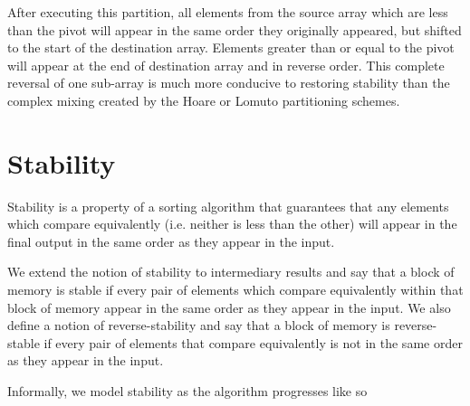 \documentclass{juliacon}
\begin{document}
After executing this partition, all elements from the source array which are less than the pivot will appear in the same order they originally appeared, but shifted to the start of the destination array. Elements greater than or equal to the pivot will appear at the end of destination array and in reverse order. This complete reversal of one sub-array is much more conducive to restoring stability than the complex mixing created by the Hoare \cite{quicksort} or Lomuto \cite{lomuto} partitioning schemes.

\section{Stability}

Stability is a property of a sorting algorithm that guarantees that any elements which compare equivalently (i.e. neither is less than the other) will appear in the final output in the same order as they appear in the input.

We extend the notion of stability to intermediary results and say that a block of memory is stable if every pair of elements which compare equivalently within that block of memory appear in the same order as they appear in the input. We also define a notion of reverse-stability and say that a block of memory is reverse-stable if every pair of elements that compare equivalently is not in the same order as they appear in the input.

Informally, we model stability as the algorithm progresses like so
\end{document}
